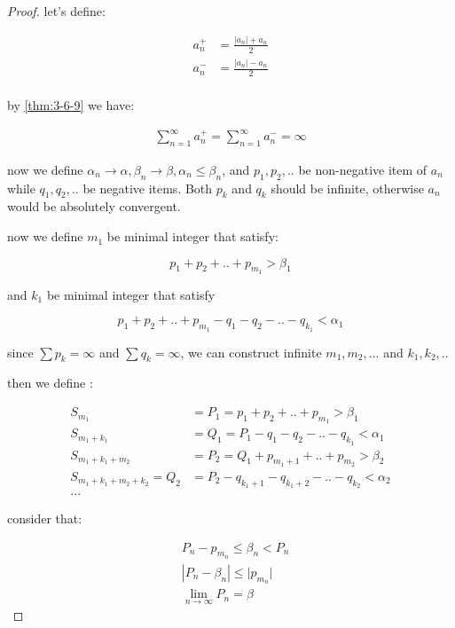 \begin{proof}
    let's define:

    \begin{align*}
        a_n^{+} &= \frac{|a_n| + a_n}{2} \\
        a_n^{-} &= \frac{|a_n| - a_n}{2} \\
    \end{align*}

    by \autoref{thm:3-6-9} we have:

    \begin{align*}
        \sum_{n=1}^{\infty}a_n^{+} = \sum_{n=1}^{\infty}a_n^{-} = \infty
    \end{align*}


    now we define $\alpha_n \to \alpha, \beta_n \to \beta, \alpha_n \le \beta_n$, and $p_1, p_2, ..$ be non-negative item of $a_n$ while $q_1, q_2, .. $
    be negative items. Both $p_k$ and $q_k$ should be infinite, otherwise $a_n$ would be absolutely convergent.

    now we define $m_1$ be minimal integer that satisfy:

    \[
        p_1 + p_2 + .. + p_{m_1} > \beta_1
    \]

    and $k_1$ be minimal integer that satisfy

    \[
        p_1 + p_2 + .. + p_{m_1} - q_1 -q_2 - .. -q_{k_1} < \alpha_1
    \]

    since $\sum p_k = \infty$ and $\sum q_k = \infty$, we can construct infinite $m_1,m_2, ...$ and $k_1,k_2, ..$

    then we define :

    \begin{align*}
        S_{m_1} & = P_1 = p_1 + p_2 + .. + p_{m_1} > \beta_1\\
        S_{m_1 + k_1} &= Q_1 = P_1 - q_1 -q_2 - .. - q_{k_1} < \alpha_1 \\
        S_{m_1 + k_1 + m_2}  &= P_2 = Q_1 + p_{m_1 + 1} + .. + p_{m_2} > \beta_2 \\
        S_{m_1 + k_1 + m_2 + k_2} =Q_2 &= P_2 - q_{k_1 + 1} -q_{k_1 + 2} - .. - q_{k_2} < \alpha_2 \\
        ...
    \end{align*}

    consider that:

    \begin{align*}
       & P_n - p_{m_n} \le \beta_n < P_n \\
       & |P_n - \beta_n | \le \lvert p_{m_n} \rvert \\
       & \lim_{n \to \infty} P_n  = \beta
    \end{align*}


\end{proof}
